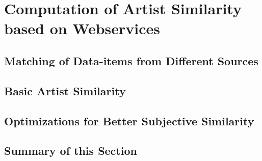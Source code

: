 \section{Computation of Artist Similarity based on Webservices}

\subsection{Matching of Data-items from Different Sources}
\subsection{Basic Artist Similarity}
\subsection{Optimizations for Better Subjective Similarity}

\subsection{Summary of this Section}